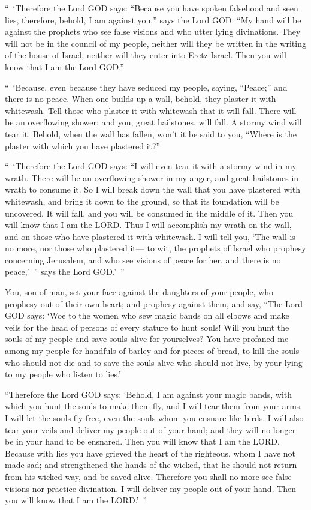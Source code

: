 \myverse{}“ ‘Therefore the Lord GOD says: “Because you have spoken falsehood
and seen lies, therefore, behold, I am against you,” says the Lord GOD.
\myverse{}“My hand will be against the prophets who see false visions and who utter lying
divinations. They will not be in the council of my people, neither will they be written in the writing
of the house of Israel, neither will they enter into Eretz-Israel. Then you will know that I am the Lord
GOD.”

\myverse{}“ ‘Because, even because they have seduced my people, saying,
“Peace;” and there is no peace. When one builds up a wall, behold, they plaster it with whitewash.
\myverse{}Tell those who plaster it with whitewash that it will fall. There will be
an overflowing shower; and you, great hailstones, will fall. A stormy wind will tear it.
\myverse{}Behold, when the wall has fallen, won’t it be said to you, “Where is the
plaster with which you have plastered it?”

\myverse{}“ ‘Therefore the Lord GOD says: “I will even tear it with a stormy
wind in my wrath. There will be an overflowing shower in my anger, and great hailstones in wrath to consume
it.
\myverse{}So I will break down the wall that you have plastered with whitewash, and
bring it down to the ground, so that its foundation will be uncovered. It will fall, and you will be consumed
in the middle of it. Then you will know that I am the LORD.
\myverse{}Thus I will accomplish my wrath on the wall, and on those who have plastered
it with whitewash. I will tell you, ‘The wall is no more, nor those who plastered it—
\myverse{}to wit, the prophets of Israel who prophesy concerning Jerusalem, and who
see visions of peace for her, and there is no peace,’ ” says the Lord GOD.’ ”

\myverse{}You, son of man, set your face against the daughters of your
people, who prophesy out of their own heart; and prophesy against them,
\myverse{}and say, “The Lord GOD says: ‘Woe to the women who sew magic bands on all
elbows and make veils for the head of persons of every stature to hunt souls! Will you hunt the souls
of my people and save souls alive for yourselves?
\myverse{}You have profaned me among my people for handfuls of barley and for pieces
of bread, to kill the souls who should not die and to save the souls alive who should not live, by your
lying to my people who listen to lies.’

\myverse{}“Therefore the Lord GOD says: ‘Behold, I am against your magic
bands, with which you hunt the souls to make them fly, and I will tear them from your arms. I will let
the souls fly free, even the souls whom you ensnare like birds.
\myverse{}I will also tear your veils and deliver my people out of your hand; and they
will no longer be in your hand to be ensnared. Then you will know that I am the LORD.
\myverse{}Because with lies you have grieved the heart of the righteous, whom I have
not made sad; and strengthened the hands of the wicked, that he should not return from his wicked way,
and be saved alive.
\myverse{}Therefore you shall no more see false visions nor practice divination. I
will deliver my people out of your hand. Then you will know that I am the LORD.’ ”



